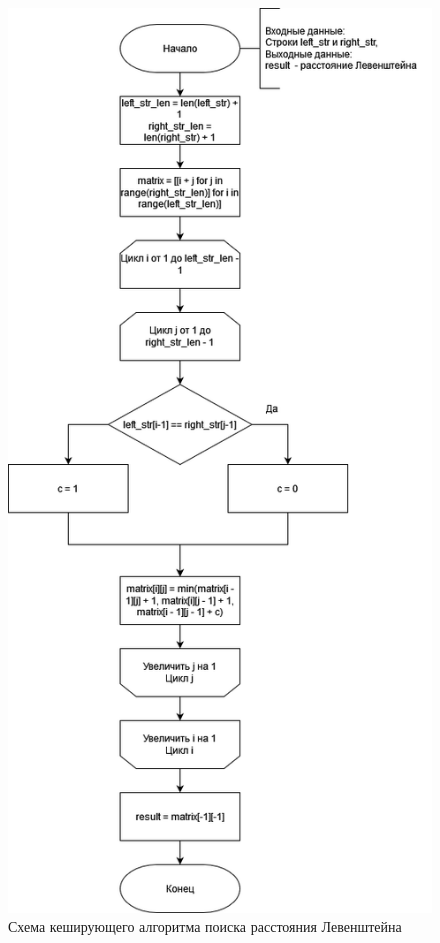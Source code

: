 \newpage 
\begin{figure}[H]
	\begin{center}
		\includegraphics[scale=0.6]{assets/cacheLevenshtain.png}
	\end{center}
	\caption{Схема кеширующего алгоритма поиска расстояния Левенштейна}
\end{figure}

